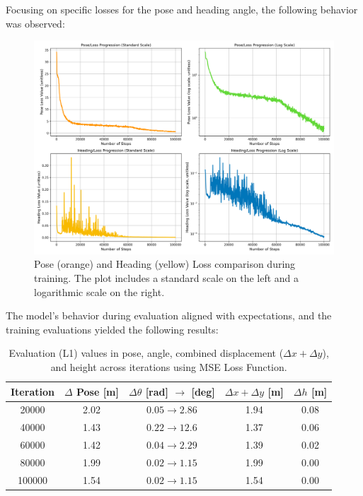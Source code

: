 Focusing on specific losses for the pose and heading angle, the following behavior was observed:
\begin{figure}[H]
    \centering
    \includegraphics[width=1\linewidth]{LateX//figs/mse_pose_heading_loss_comparison.png}
    \caption{Pose (orange) and Heading (yellow) Loss comparison during training. The plot includes a standard scale on the left and a logarithmic scale on the right.}
    \label{fig:pose-heading-loss}
\end{figure}

The model's behavior during evaluation aligned with expectations, and the training evaluations yielded the following results:
\begin{table}[H]
    \centering
    \renewcommand{\arraystretch}{1.2} 
    \setlength{\tabcolsep}{10pt}
    \begin{tabular}{c c c c c}
        \toprule
        \textbf{Iteration} & \textbf{$\Delta$ Pose [m]} & \textbf{$\Delta \theta$ [rad] $\rightarrow$ [deg]} & \textbf{$\Delta x + \Delta y$ [m]} & \textbf{$\Delta h$ [m]} \\
        \midrule
        \num{20000}  & 2.02 & $0.05 \rightarrow 2.86$  & 1.94 & 0.08 \\
        \num{40000}  & 1.43 & $0.22 \rightarrow 12.6$  & 1.37 & 0.06 \\
        \num{60000}  & 1.42 & $0.04 \rightarrow 2.29$  & 1.39 & 0.02 \\
        \num{80000}  & 1.99 & $0.02 \rightarrow 1.15$  & 1.99 & 0.00 \\
        \num{100000} & 1.54 & $0.02 \rightarrow 1.15$  & 1.54 & 0.00 \\
        \bottomrule
    \end{tabular}
    \caption{Evaluation (L1) values in pose, angle, combined displacement ($\Delta x + \Delta y$), and height across iterations using MSE Loss Function.}
    \label{tab:pose_variations_mse}
\end{table}

